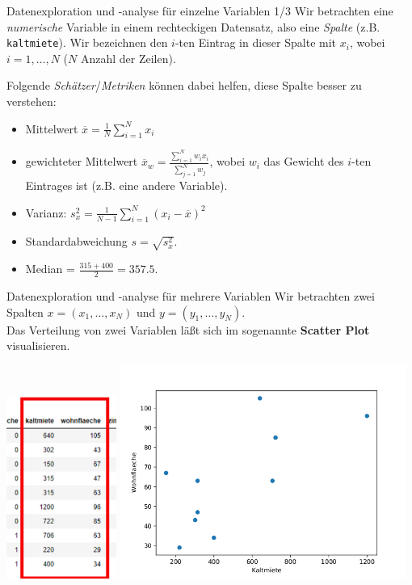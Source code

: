 \documentclass[]{book}
\theoremstyle{definition}
\theoremstyle{definition}
\theoremstyle{definition}
\theoremstyle{definition}
\theoremstyle{remark}
\begin{document}
Datenexploration und -analyse für einzelne Variablen 1/3 Wir betrachten
eine \emph{numerische} Variable in einem rechteckigen Datensatz, also eine
\emph{Spalte} (z.B. \texttt{kaltmiete}). Wir bezeichnen den \(i\)-ten Eintrag in
dieser Spalte mit \(x_i\), wobei \(i=1,\ldots,N\) (\(N\) Anzahl der Zeilen).

Folgende \emph{Schätzer}/\emph{Metriken} können dabei helfen, diese Spalte besser
zu verstehen:

\begin{itemize}
\item
  Mittelwert \(\overline x= \frac1 N\sum_{i=1}^N x_i\)
\item
  gewichteter Mittelwert
  \(\overline x_w = \frac{\sum_{i=1}^N w_i x_i}{\sum_{j=1}^N w_j}\),
  wobei \(w_i\) das Gewicht des \(i\)-ten Eintrages ist (z.B. eine andere
  Variable).
\item
  Varianz: \(s_x^2 = \frac{1}{N-1} \sum_{i=1}^N (x_i-\overline x)^2\)
\item
  Standardabweichung \(s = \sqrt{s_x^2}\).
\item
  Median = \(\frac{315 + 400}{2} = 357.5\).
\end{itemize}

Datenexploration und -analyse für mehrere Variablen Wir betrachten zwei
Spalten \(x = (x_1,\ldots,x_N)\) und \(y = (y_1,\ldots, y_N)\).\\

Das Verteilung von zwei Variablen läßt sich im sogenannte \textbf{Scatter Plot} visualisieren.

\includegraphics[width=0.27\textwidth,height=\textheight]{bilder/dataframe_spalte3.png}
\includegraphics[width=0.7\textwidth,height=\textheight]{bilder/scatterplot.png}
\end{document}
